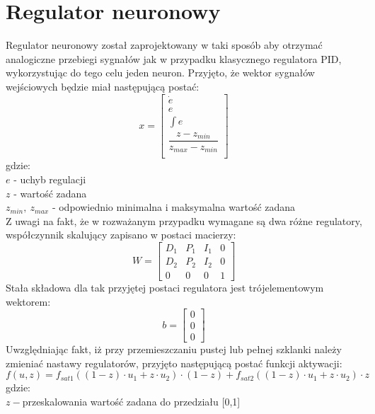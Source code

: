 \chapter{Regulator neuronowy}
Regulator neuronowy został zaprojektowany w taki sposób aby otrzymać analogiczne przebiegi sygnałów jak w przypadku klasycznego regulatora PID, wykorzystując do tego celu jeden neuron. Przyjęto, że wektor sygnałów wejściowych będzie miał następującą postać: 
\begin{equation}\label{key}
x = \begin{bmatrix}
\dot {e}\\
e\\
\int e\\
\dfrac{z-z_{min}}{z_{max} - z_{min}}\\
\end{bmatrix}
\end{equation}
gdzie:\\
$e$ - uchyb regulacji\\
$z$ - wartość zadana\\
$z_{min}, \ z_{max}$ - odpowiednio minimalna i maksymalna wartość zadana\\
Z uwagi na fakt, że w rozważanym przypadku wymagane są dwa różne regulatory, współczynnik skalujący zapisano w postaci macierzy: 
\begin{equation}\label{key}
W = \begin{bmatrix}
D_1& P_1& I_1&0\\
D_2& P_2& I_2&0\\
0&0&0&1
\end{bmatrix}
\end{equation} 
Stała składowa dla tak przyjętej postaci regulatora jest trójelementowym wektorem:
\begin{equation}\label{key}
b = \begin{bmatrix}
0\\0\\0
\end{bmatrix}
\end{equation}
Uwzględniając fakt, iż przy przemieszczaniu pustej lub pełnej szklanki należy zmieniać nastawy regulatorów, przyjęto następującą postać funkcji aktywacji:
\begin{equation}\label{key}
f(u,z) = f_{sat1} ((1-z) \cdot u_1 + z \cdot u_2) \cdot (1-z) + f_{sat2} ((1-z) \cdot u_1 + z \cdot u_2) \cdot z
\end{equation}
gdzie: \\
$z - $przeskalowania wartość zadana do przedziału [0,1]\\
